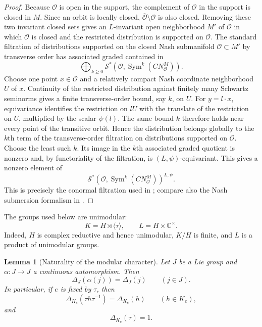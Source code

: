 \documentclass[10pt,a4paper]{amsart}
\numberwithin{equation}{section}
\newtheorem{lemma}[theorem]{Lemma}
\newcommand{\C}{\mathbb C}
\newcommand{\Sym}{\operatorname{Sym}}
\newcommand{\cS}{\mathcal S}
\begin{document}
\begin{proof}
Because \(\mathcal O\) is open in the support,
the complement of \(\mathcal O\) in the support is closed in \(M\).  Since an orbit is
locally closed, \(\overline{\mathcal O}\setminus\mathcal O\) is also
closed.  Removing these two invariant closed sets gives an
\(L\)-invariant open neighborhood \(M'\) of \(\mathcal O\) in which
\(\mathcal O\) is closed and the restricted distribution is supported on
\(\mathcal O\).  The standard filtration of distributions supported on the
closed Nash submanifold \(\mathcal O\subset M'\) by transverse order has
associated graded contained in
\[
  \bigoplus_{k\geq0}
  \cS^*\!\left(\mathcal O,
  \Sym^k(CN_{\mathcal O}^{M})\right).
\]
Choose one point $x\in\mathcal O$ and a relatively compact Nash coordinate
neighborhood $U$ of $x$.  Continuity of the restricted distribution against
finitely many Schwartz seminorms gives a finite transverse-order bound, say
$k$, on $U$.  For $y=l\cdot x$, equivariance identifies the restriction on
$lU$ with the translate of the restriction on $U$, multiplied by the scalar
$\psi(l)$.  The same bound $k$ therefore holds near every point of the
transitive orbit.  Hence the distribution belongs globally to the $k$th term
of the transverse-order filtration on distributions supported on
$\mathcal O$.  Choose the least such $k$.  Its image in the $k$th associated
graded quotient is nonzero and, by functoriality of the filtration, is
$(L,\psi)$-equivariant.  This gives a nonzero element of
\[
 \cS^*\!\left(\mathcal O,\Sym^k(CN_{\mathcal O}^{M})\right)^{L,\psi}.
\]
This is precisely the conormal filtration used in
\cite[Theorem~2.5.6]{AG09}; compare also the Nash submersion formalism in
\cite[Appendix~B]{AG09}.
\end{proof}

The groups used below are unimodular:
\[
  K=H\rtimes\langle\tau\rangle,
  \qquad L=H\times\C^\times.
\]
Indeed, \(H\) is complex reductive and hence unimodular, \(K/H\) is finite,
and \(L\) is a product of unimodular groups.

\begin{lemma}[Naturality of the modular character]
\label{cii:lem:modular-naturality}
Let \(J\) be a Lie group and \(\alpha:J\to J\) a continuous
automorphism.  Then
\[
\Delta_J(\alpha(j))=\Delta_J(j)
\qquad(j\in J).
\]
In particular, if \(e\) is fixed by \(\tau\), then
\[
\Delta_{K_e}(\tau h\tau^{-1})=\Delta_{K_e}(h)
\qquad(h\in K_e),
\]
and
\[
\Delta_{K_e}(\tau)=1.
\]
\end{lemma}
\end{document}
